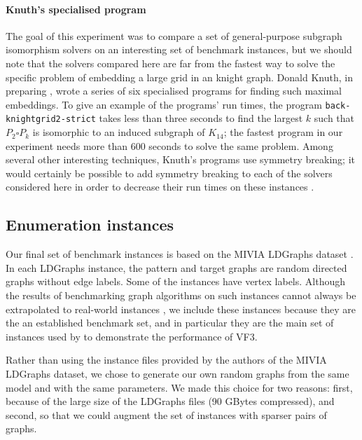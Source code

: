 \paragraph{Knuth's specialised program}
The goal of this experiment was to compare a set of general-purpose subgraph isomorphism
solvers on an interesting set of benchmark instances, but we should note that the solvers
compared here are far from the fastest way to solve the specific problem of embedding
a large grid in an knight graph.
Donald Knuth, in preparing \citet{knuth2022art}, wrote a series of six specialised
programs for finding such maximal embeddings.  To give an example of the programs' run times,
the program \texttt{back-knightgrid2-strict} takes less than
three seconds to find the largest $k$ such that $P_2 \square P_k$
is isomorphic to an induced subgraph of $K_{14}$; the fastest
program in our experiment needs more than 600 seconds to solve the same problem.
Among several other interesting techniques, Knuth's programs use symmetry breaking;
it would certainly be possible to add symmetry breaking to each of the solvers considered
here in order to decrease their run times on these instances \citep{zampelli2007symmetry}.

\FloatBarrier

\subsection{Enumeration instances}\label{subsec:si-enumeration-experiment}

Our final set of benchmark instances is based on the MIVIA LDGraphs dataset
\citep{DBLP:journals/pami/CarlettiFSV18}.  In each LDGraphs instance, the pattern and
target graphs are random directed graphs without edge labels.
Some of the instances have vertex labels.
Although the results of benchmarking graph algorithms on such instances cannot
always be extrapolated to real-world instances \citep{DBLP:conf/cp/McCreeshPST17},
we include these instances because they are the an established benchmark set,
and in particular they are the main set of instances used by \cite{DBLP:journals/pami/CarlettiFSV18}
to demonstrate the performance of VF3.

Rather than using the instance files provided by the authors of the MIVIA LDGraphs
dataset, we chose to generate our own random graphs from the same model and with the
same parameters.  We made this choice for two reasons: first, because of the large size
of the LDGraphs files (90 GBytes compressed), and second, so that we could augment
the set of instances with sparser pairs of graphs.

